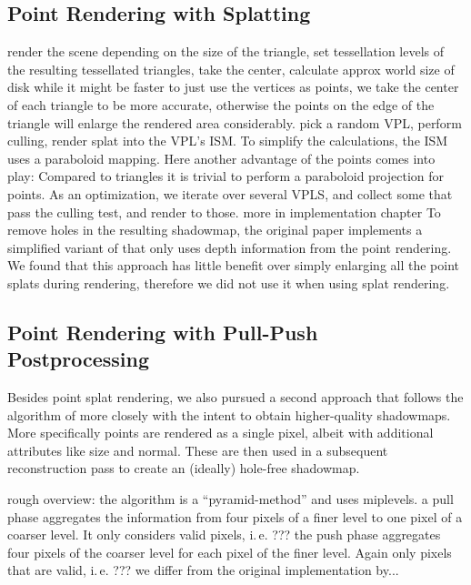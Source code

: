 \subsection{Point Rendering with Splatting}
\begin{outline}
\1 render the scene
\1 depending on the size of the triangle, set tessellation levels
\1 of the resulting tessellated triangles, take the center, calculate approx world size of disk
\1 while it might be faster to just use the vertices as points, we take the center of each triangle to be more accurate, otherwise the points on the edge of the triangle will enlarge the rendered area considerably.
\1 pick a random VPL, perform culling, render splat into the VPL's ISM. To simplify the calculations, the ISM uses a paraboloid mapping. Here another advantage of the points comes into play: Compared to triangles it is trivial to perform a paraboloid projection for points.
\1 As an optimization, we iterate over several VPLS, and collect some that pass the culling test, and render to those. more in implementation chapter
\1 To remove holes in the resulting shadowmap, the original paper implements a simplified variant of \citet{Marroquim:2007:reconstruction} that only uses depth information from the point rendering. We found that this approach has little benefit over simply enlarging all the point splats during rendering, therefore we did not use it when using splat rendering.
\end{outline}

\subsection{Point Rendering with Pull-Push Postprocessing}

\begin{outline}
\1 Besides point splat rendering, we also pursued a second approach that follows the algorithm of \citet{Marroquim:2007:reconstruction} more closely with the intent to obtain higher-quality shadowmaps. More specifically points are rendered as a single pixel, albeit with additional attributes like size and normal. These are then used in a subsequent reconstruction pass to create an (ideally) hole-free shadowmap.

\1 rough overview: the algorithm is a ``pyramid-method'' and uses miplevels.
\1 a pull phase aggregates the information from four pixels of a finer level to one pixel of a coarser level.
\1 It only considers valid pixels, i.\,e. ???
\1 the push phase aggregates four pixels of the coarser level for each pixel of the finer level.
\1 Again only pixels that are valid, i.\,e. ???
\1 we differ from the original implementation by...
\end{outline}



